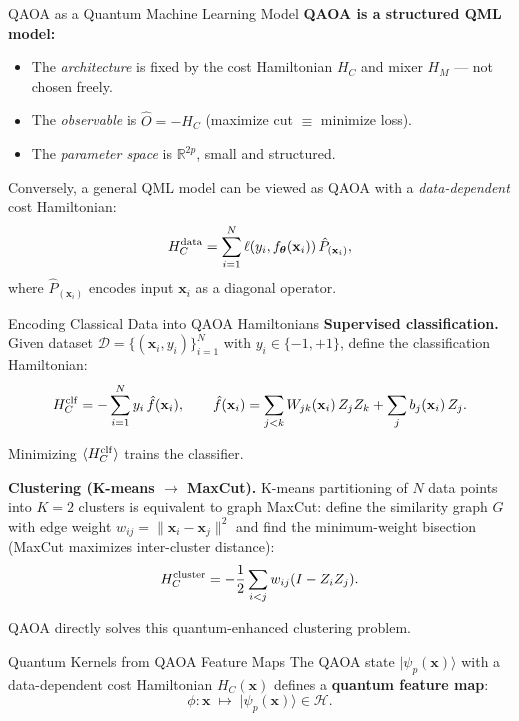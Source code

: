\documentclass{beamer}
\begin{document}
\begin{frame}
\begin{frame}{QAOA as a Quantum Machine Learning Model}
\textbf{QAOA is a structured QML model:}
\begin{itemize}
\item The \emph{architecture} is fixed by the cost Hamiltonian $H_C$
  and mixer $H_M$ — not chosen freely.
\item The \emph{observable} is $\hat{O} = -H_C$ (maximize cut $\equiv$ minimize loss).
\item The \emph{parameter space} is $\mathbb{R}^{2p}$, small and structured.
\end{itemize}

\medskip

Conversely, a general QML model can be viewed as QAOA with a
\emph{data-dependent} cost Hamiltonian:
\[
H_C^{\rm data} = \sum_{i=1}^N \ell(y_i, f_{\boldsymbol{\theta}}(\mathbf{x}_i))\,
\hat{P}_{(\mathbf{x}_i)},
\]
where $\hat{P}_{(\mathbf{x}_i)}$ encodes input $\mathbf{x}_i$ as a
diagonal operator.
\end{frame}


\begin{frame}{Encoding Classical Data into QAOA Hamiltonians}
\textbf{Supervised classification.}  Given dataset
$\mathcal{D} = \{(\mathbf{x}_i, y_i)\}_{i=1}^N$ with
$y_i\in\{-1,+1\}$, define the classification Hamiltonian:
\[
H_C^{\rm clf}
= -\sum_{i=1}^N y_i\,\hat{f}(\mathbf{x}_i),
\qquad
\hat{f}(\mathbf{x}_i)
= \sum_{j<k} W_{jk}(\mathbf{x}_i)\,Z_jZ_k + \sum_j b_j(\mathbf{x}_i)\,Z_j.
\]

Minimizing $\langle H_C^{\rm clf}\rangle$ trains the classifier.

\medskip

\textbf{Clustering (K-means $\to$ MaxCut).}  K-means partitioning of
$N$ data points into $K=2$ clusters is equivalent to graph MaxCut:
define the similarity graph $G$ with edge weight
$w_{ij} = \|\mathbf{x}_i - \mathbf{x}_j\|^2$ and find the
minimum-weight bisection (MaxCut maximizes inter-cluster distance):
\[
H_C^{\rm cluster} = -\frac{1}{2}\sum_{i<j}w_{ij}(I - Z_iZ_j).
\]

QAOA directly solves this quantum-enhanced clustering problem.
\end{frame}


\begin{frame}{Quantum Kernels from QAOA Feature Maps}
The QAOA state $|\psi_p(\mathbf{x})\rangle$ with a data-dependent
cost Hamiltonian $H_C(\mathbf{x})$ defines a \textbf{quantum feature map}:
\[
\phi:\mathbf{x} \;\longmapsto\; |\psi_p(\mathbf{x})\rangle \in \mathcal{H}.
\]


\end{frame}
\end{frame}
\end{document}
